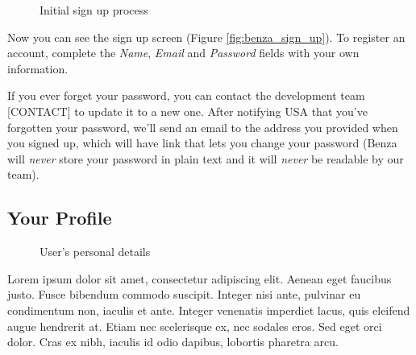 \documentclass{article}
\begin{document}
    \begin{figure}[ht]
    \caption{Initial sign up process}
    \end{figure}
    
    Now you can see the sign up screen (Figure \ref{fig:benza_sign_up}). To register an account, complete the \emph{Name}, \emph{Email} and \emph{Password} fields with your own information. \par
    
    If you ever forget your password, you can contact the development team [CONTACT] to update it to a new one. After notifying USA that you've forgotten your password, we'll send an email to the address you provided when you signed up, which will have link that lets you change your password (Benza will \emph{never} store your password in plain text and it will \emph{never} be readable by our team). \par
    
    \newpage
    \subsection{Your Profile}
    
        \begin{wrapfigure}{R}{0.42\textwidth} %
        \centering
        \caption{User's personal details}
        \label{fig:benza_profile}
        \vspace{-40pt} %
    \end{wrapfigure}
    
    Lorem ipsum dolor sit amet, consectetur adipiscing elit. Aenean eget faucibus justo. Fusce bibendum commodo suscipit. Integer nisi ante, pulvinar eu condimentum non, iaculis et ante. Integer venenatis imperdiet lacus, quis eleifend augue hendrerit at. Etiam nec scelerisque ex, nec sodales eros. Sed eget orci dolor. Cras ex nibh, iaculis id odio dapibus, lobortis pharetra arcu. \par
\end{document}
